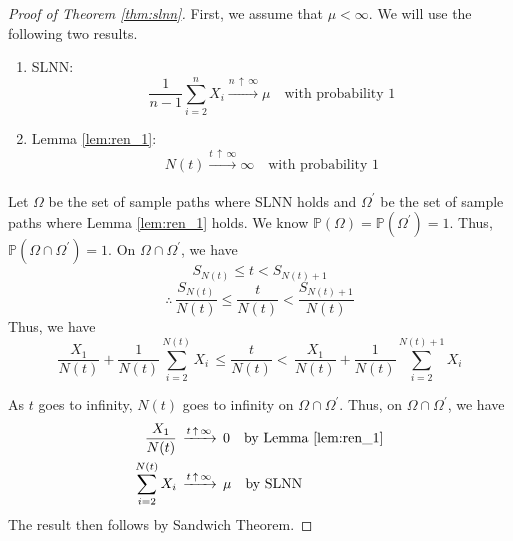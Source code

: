 \documentclass[12pt]{article}
\def\P{\mathbb{P}}
\theoremstyle{definition}
\begin{document}
\begin{proof}[Proof of Theorem \ref{thm:slnn}]
    First, we assume that $\mu < \infty$. We will use the following two results. \begin{enumerate}
        \item SLNN: 
        \[
            \frac{1}{n-1} \sum_{i=2}^{n} X_i \xrightarrow[]{n \, \uparrow \, \infty} \mu \quad \text{with probability }1
        \]  
        \item Lemma \ref{lem:ren_1}:
        \[
            N(t) \xrightarrow[]{t \, \uparrow \, \infty} \infty \quad \text{with probability }1
        \]  
            \end{enumerate}
        Let $\Omega$ be the set of sample paths where SLNN holds and $\Omega^{\prime}$ be the set of sample paths where Lemma \ref{lem:ren_1} holds. We know $\P(\Omega) = \P(\Omega^{\prime}) =1 $. Thus, $\P\left( \Omega \cap \Omega^{\prime} \right) = 1$. On $\Omega \cap \Omega^{\prime}$, we have
        \[
            S_{N(t)} \leq t < S_{N(t)+1}
        \]
        \[
            \therefore \, \frac{S_{N(t)}}{N(t)} \leq \frac{t}{N(t)} < \frac{S_{N(t)+1}}{N(t)}
        \]
        Thus, we have
        \[
            \frac{X_1}{N(t)} + \frac{1}{N(t)} \sum_{i=2}^{N(t)} X_i \, \leq \frac{t}{N(t)} < \, \frac{X_1}{N(t)} + \frac{1}{N(t)} \sum_{i=2}^{N(t)+1} X_i
        \]  
        
        As $t$ goes to infinity, $N(t)$ goes to infinity on $\Omega \cap \Omega^{\prime}$. Thus, on $\Omega \cap \Omega^{\prime}$, we have
        \begin{align*}
            \frac{X_1}{N(t)} \, &\xrightarrow[]{t \, \uparrow \, \infty} \, 0 \quad \text{by Lemma \ref{lem:ren_1}} \\
            \sum_{i=2}^{N(t)} X_i \, &\xrightarrow[]{t \, \uparrow \, \infty} \, \mu \quad \text{by SLNN} 
        \end{align*}
        The result then follows by Sandwich Theorem. 
        
        \medskip
        

\end{proof}
\end{document}
